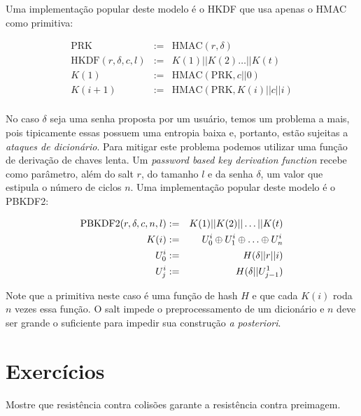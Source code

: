 Uma implementação popular deste modelo é o HKDF \cite{Krawczyk10} que usa apenas o HMAC como primitiva:

\begin{eqnarray*}
  \textrm{PRK}      & := & \textrm{HMAC}(r, \delta)\\
  \textrm{HKDF}(r, \delta, c, l) & := & K(1)||K(2) \dots ||K(t)\\
  K(1)     & := & \textrm{HMAC}(\textrm{PRK}, c||0)\\
  K(i + 1) & := & \textrm{HMAC}(\textrm{PRK}, K(i)||c||i)\\
\end{eqnarray*}

No caso $\delta$ seja uma senha proposta por um usuário, temos um problema a mais, pois tipicamente essas possuem uma entropia baixa e, portanto, estão sujeitas a {\em ataques de dicionário}.
Para mitigar este problema podemos utilizar uma função de derivação de chaves lenta.
Um {\em password based key derivation function} recebe como parâmetro, além do salt $r$, do tamanho $l$ e da senha $\delta$, um valor que estipula o número de ciclos $n$.
Uma implementação popular deste modelo é o PBKDF2:

\begin{eqnarray*}
  \textrm{PBKDF2}(r, \delta, c, n, l) & := & K(1)||K(2)|| \dots ||K(t)\\
  K(i)     & := & U_0^i \xor U_1^i \xor \dots \xor U_n^i\\
  U_0^i    & := & H(\delta||r||i)\\
  U_j^i    & := & H(\delta||U_{j-1}^1)\\
\end{eqnarray*}

Note que a primitiva neste caso é uma função de hash $H$ e que cada $K(i)$ roda $n$ vezes essa função.
O salt impede o preprocessamento de um dicionário e $n$ deve ser grande o suficiente para impedir sua construção {\em a posteriori}.


\section{Exercícios}
\label{sec:exercicios}


\begin{exercicio}
  Mostre que resistência contra colisões garante a resistência contra preimagem.
\end{exercicio}

